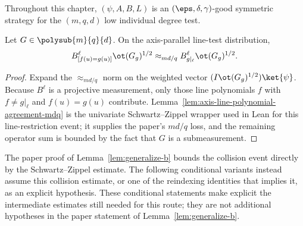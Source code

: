 Throughout this chapter, $(\psi,A,B,L)$ is an $(\eps,\delta,\gamma)$-good symmetric strategy for the $(m,q,d)$ low individual degree test.


\begin{lemma}\label{lem:generalize-b}
	\leanok
	Let $G \in \polysub{m}{q}{d}$. On the axis-parallel line-test distribution,
	\[
		B^{\ell}_{[f(u)=g(u)]} \ot (G_g)^{1/2}
		\approx_{md/q}
		B^{\ell}_{g|_{\ell}} \ot (G_g)^{1/2}.
	\]
\end{lemma}
\begin{proof}
	\leanok
	Expand the $\approx_{md/q}$ norm on the weighted vector $(I\ot (G_g)^{1/2})\ket{\psi}$. Because $B^\ell$ is a projective measurement, only those line polynomials $f$ with $f\ne g|_\ell$ and $f(u)=g(u)$ contribute. Lemma~\ref{lem:axis-line-polynomial-agreement-mdq} is the univariate Schwartz--Zippel wrapper used in Lean for this line-restriction event; it supplies the paper's $md/q$ loss, and the remaining operator sum is bounded by the fact that $G$ is a submeasurement.
\end{proof}

\begin{remark}\label{rem:generalize-b-collision-residual-conditional}
	The paper proof of Lemma~\ref{lem:generalize-b} bounds the collision event
	directly by the Schwartz--Zippel estimate.  The following conditional variants
	instead assume this collision estimate, or one of the reindexing identities
	that implies it, as an explicit hypothesis.  These conditional statements
	make explicit the intermediate estimates still needed for this route; they
	are not additional hypotheses in the paper statement of
	Lemma~\ref{lem:generalize-b}.
\end{remark}

